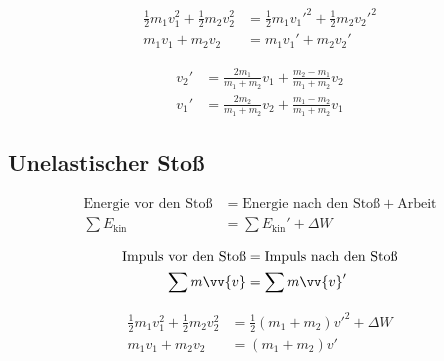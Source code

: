 \begin{boxleft}
\end{boxleft}\begin{boxrightshaded}
\begin{align*}
\frac{1}{2}m_1v_1^2+\frac{1}{2}m_2v_2^2&=\frac{1}{2}m_1v_1'^2+\frac{1}{2}m_2v_2'^2\\
m_1v_1+m_2v_2&=m_1v_1'+m_2v_2'
\end{align*}
\end{boxrightshaded}

\begin{boxleft}
\end{boxleft}\begin{boxrightshaded}
\begin{align*}
v_2'&=\frac{2m_1}{m_1+m_2}v_1+\frac{m_2-m_1}{m_1+m_2}v_2\\
v_1'&=\frac{2m_2}{m_1+m_2}v_2+\frac{m_1-m_2}{m_1+m_2}v_1
\end{align*}
\end{boxrightshaded}

\subsection{Unelastischer Stoß}

\begin{boxleft}
\end{boxleft}\begin{boxrightshaded}
\begin{align*}
\text{Energie vor den Stoß} &= \text{Energie nach den Stoß}+\text{Arbeit}\nonumber\\
\sum E_{\text{kin}}&=\sum E_{\text{kin}}'+\Delta W
\end{align*}
\end{boxrightshaded}

\begin{boxleft}
\end{boxleft}\begin{boxrightshaded}
\begin{align*}
\text{Impuls vor den Stoß} &= \text{Impuls nach den Stoß}\nonumber\\
\sum m\vv{v}&= \sum m\vv{v}'
\end{align*}
\end{boxrightshaded}

\begin{boxleft}
\end{boxleft}\begin{boxrightshaded}
\begin{align*}
\frac{1}{2}m_1v_1^2+\frac{1}{2}m_2v_2^2&=\frac{1}{2}\left(m_1+m_2\right)v'^2+\Delta W\\
m_1v_1+m_2v_2&=\left(m_1+m_2\right)v'
\end{align*}
\end{boxrightshaded}

